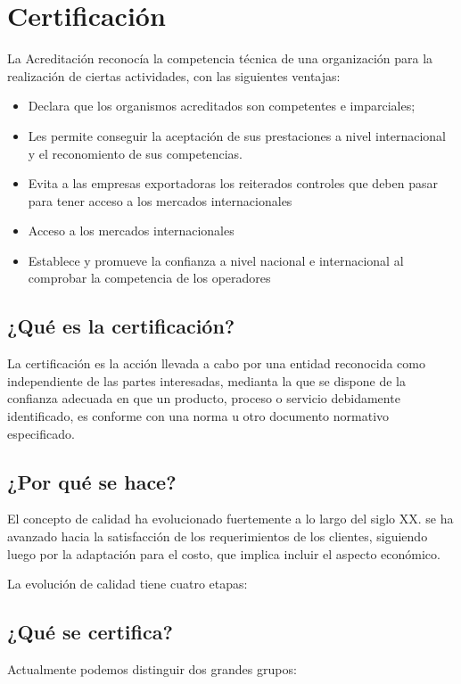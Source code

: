 \chapter{Certificación}
La Acreditación reconocía la competencia técnica de una organización para la realización de ciertas actividades, con las siguientes ventajas:
\begin{itemize}
    \item Declara que los organismos acreditados son competentes e imparciales;
    \item Les permite conseguir la aceptación de sus prestaciones a nivel internacional y el reconomiento de sus competencias.
    \item Evita a las empresas exportadoras los reiterados controles que deben pasar para tener acceso a los mercados internacionales
    \item Acceso a los mercados internacionales
    \item Establece y promueve la confianza a nivel nacional e internacional al comprobar la competencia de los operadores
\end{itemize}

\section{¿Qué es la certificación?}
La certificación es la acción llevada a cabo por una entidad reconocida como independiente de las partes interesadas, medianta la que se dispone de la confianza adecuada en que un producto, proceso o servicio debidamente identificado, es conforme con una norma u otro documento normativo especificado.

\section{¿Por qué se hace?}

El concepto de calidad ha evolucionado fuertemente a lo largo del siglo XX. se ha avanzado hacia la satisfacción de los requerimientos de los clientes, siguiendo luego por la adaptación para el costo, que implica incluir el aspecto económico.

La evolución de calidad tiene cuatro etapas:

\section{¿Qué se certifica?}
Actualmente podemos distinguir dos grandes grupos:

